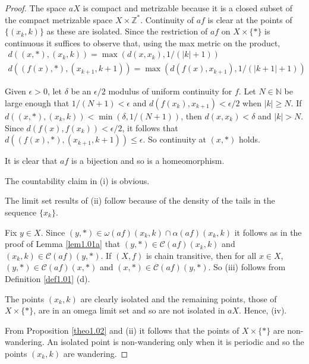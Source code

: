 \documentclass[12pt]{amsart}
\def \N {\mathbb N}
\def \Z {\mathbb Z}
\def \CC {\mathcal C}
\def \a {\alpha }
\def \ep {\epsilon}
\def \om {\omega}
\def \d {\delta}
\numberwithin{equation}{section}
\begin{document}
 \begin{proof} The space $aX$ is compact and metrizable because it is a closed subset of the compact metrizable space $X \times \Z^*$.
 Continuity of $af$ is clear at the points of $\{ (x_k,k) \}$ as these are
 isolated. Since the restriction of $af$ on $X \times \{ * \}$ is continuous it suffices to observe that, using the max metric on the product,
  \begin{equation}\label{eq1.13}\begin{split}
d((x,*),(x_k,k)) = \max(d(x,x_k), 1/(|k|+1)) \hspace{2cm}\\
d((f(x),*),(x_{k+1},k+1)) = \max(d(f(x),x_{k+1}),1/(|k+1|+1))
\end{split}\end{equation}

Given $\ep > 0$, let $\d $ be an $\ep/2$ modulus of uniform continuity for $f$. Let $N \in \N$ be large enough that $1/(N+1) < \ep$ and
$d(f(x_k),x_{k+1}) < \ep/2$ when $|k| \ge N$. If $d((x,*),(x_k,k)) < \min(\d, 1/(N+1))$, then $d(x,x_k) < \d$ and $|k| > N$.
Since $d(f(x),f(x_k)) < \ep/2$, it follows that $d((f(x),*),(x_{k+1},k+1)) \le \ep$. So continuity at $(x,*)$ holds.

It is clear that $af$ is a bijection and so is a homeomorphism.

 The countability claim in (i) is obvious.

The limit set results of (ii) follow because of the density of the tails in the sequence $\{ x_k \}$.

Fix $y \in X$. Since $(y,*) \in \om (af)(x_k,k) \cap \a (af)(x_k,k)$ it follows as in the proof of Lemma \ref{lem1.01a} that
$(y,*) \in \CC (af)(x_k,k)$ and $(x_k,k) \in \CC (af)(y,*)$. If $(X,f)$ is chain transitive, then for all $x \in X$,
$(y,*) \in \CC (af)(x,*)$ and $(x,*) \in \CC (af)(y,*)$.
So (iii) follows from  Definition \ref{def1.01}   (d).

The points $(x_k,k)$ are clearly isolated and the remaining points, those of $X \times \{ * \}$, are in an omega limit set and so
are not isolated in $aX$. Hence, (iv).

From Proposition \ref{theo1.02} and (ii) it follows that the points of $X \times \{ * \}$ are non-wandering. An isolated point is non-wandering only
when it is periodic and so the points $(x_k,k)$ are wandering.


\end{proof}\vspace{.25cm}
\end{document}
